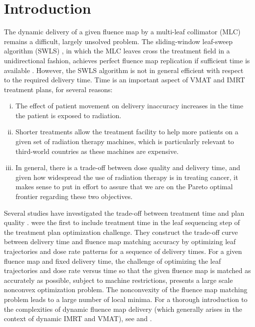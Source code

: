 \documentclass[12pt]{article}
\begin{document}
\section{Introduction}
The dynamic delivery of a given fluence map by a multi-leaf collimator (MLC) remains a difficult, largely unsolved problem.
The sliding-window leaf-sweep algorithm (SWLS) \cite{leafsweep}, 
    in which the MLC leaves cross the treatment field in a unidirectional fashion, 
    achieves perfect fluence map replication if sufficient time is available \cite{Stein94}.
However, the SWLS algorithm is not in general efficient with respect to the required delivery time.
Time is an important aspect of VMAT and IMRT treatment plans, for several reasons:
\begin{enumerate}[i)]
  \item The effect of patient movement on delivery inaccuracy increases in the time the patient is exposed to radiation.
  \item Shorter treatments allow the treatment facility to help more patients on a given set of radiation therapy machines, 
        which is particularly relevant to third-world countries as these machines are expensive.
  \item In general, there is a trade-off between dose quality and delivery time, and given how widespread the use of radiation therapy is in treating cancer, it makes sense to put in effort to assure that we are on the Pareto optimal frontier regarding these two objectives.
  
\end{enumerate}
Several studies have investigated the trade-off between treatment time and plan quality \cite{tradeoffSalari,tradeoffMCO,tradeoffCraft}.
\cite{balvertcraft} were the first to include treatment time in the leaf sequencing step of the treatment plan optimization challenge.
They construct the trade-off curve between delivery time and fluence map matching accuracy by optimizing leaf trajectories and dose rate patterns for a sequence of delivery times.
For a given fluence map and fixed delivery time, the challenge of optimizing the leaf trajectories and dose rate versus time so that the given fluence map is matched as accurately as possible, subject to machine restrictions, presents a large scale nonconvex optimization problem.
The nonconvexity of the fluence map matching problem leads to a large number of local minima.
For a thorough introduction to the complexities of dynamic fluence map delivery (which generally arises in the context of dynamic IMRT and VMAT),
 see \cite{balvertcraft} and \cite{unkvmatreview}.
\end{document}
